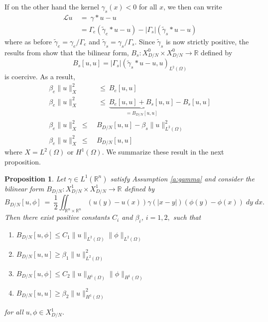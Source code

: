 \documentclass[11pt]{amsart}   	%
\theoremstyle{plain}
\numberwithin{equation}{section}
\newtheorem{proposition}[thm]{Proposition}
\def\R{\mathbb{R}}
\begin{document}
If on the other hand the kernel $\gamma_s(x)<0$ for all $x$, we then can write
\begin{align*}
\mathcal{L} u \ & = \ \gamma \ast u - u \\
 & = \Gamma_e(  \tilde{\gamma}_e \ast u - u)  -  |\Gamma_s|( \tilde{\gamma}_s \ast u - u)
 \end{align*}
where as before $\tilde{\gamma}_e  = \gamma_e / \Gamma_e $ and $\tilde{\gamma}_s =  \gamma_s/ \Gamma_s$.
Since $\tilde{\gamma}_s$ is now strictly positive, the results from \cite[Lemmas 2.3 and 2.5]{cappanera2024analysis} show that the bilinear form, $B_s: X^0_{D/N} \times X^0_{D/N} \longrightarrow \R$ defined by
\[ B_s[u,u] = |\Gamma_s| ( \tilde{\gamma}_s \ast u - u, u)_{L^2(\Omega)} \]
is coercive. As a result,
\begin{align*}
\beta_e \| u\|^2_{X} & \ \leq  \ B_e[u,u]\\
\beta_e \| u\|^2_{X}  & \ \leq \ \underbrace{ B_e[u,u] +B_s[u,u] }_{=B_{D/N}[u,u]} - B_s[u,u]\\
\beta_e \| u\|^2_{X}  \ \leq \ & B_{D/N}[u,u] - \beta_s \| u\|^2_{L^2(\Omega)}\\
\beta_e \| u\|^2_{X}  \ \leq \ & B_{D/N}[u,u] 
  \end{align*}
where $X = L^2(\Omega)$ or $ H^1(\Omega)$. We summarize these result in the next proposition.


\begin{proposition}\label{p:bilinear_general}
Let $\gamma \in L^1(\R^n)$ satisfy Assumption  \ref{a:gamma} and consider the bilinear form  $B_{D/N}: X^1_{D/N} \times X^1_{D/N} \longrightarrow \R $ defined by
\[ B_{D/N}[u,\phi] \ = \ \frac{1}{2} \iint_{\R^n\times \R^n }  (u(y) - u(x)) \gamma(|x-y|) (\phi(y) -\phi(x)) \;dy\;dx.\]
Then there exist positive constants $C_i$ and $\beta_i$, $i =1,2,$ such that
\begin{enumerate}[label=\textbf{T\arabic*}]
\item\label{T1} $ B_{D/N}[u,\phi] \leq C_1 \| u\|_{L^2(\Omega)} \| \phi\|_{L^2(\Omega)}$
\item\label{T2} $ B_{D/N}[u,u] \geq \beta_1 \| u\|^2_{L^2(\Omega)}$
\item\label{T3} $ B_{D/N}[u,\phi] \leq C_2 \| u\|_{H^1(\Omega)} \| \phi\|_{H^1(\Omega)}$
\item\label{T4} $ B_{D/N}[u,u] \geq \beta_2 \| u\|^2_{H^1(\Omega)}$
\end{enumerate}
for all $u, \phi \in X^1_{D/N}$.
\end{proposition}
\end{document}
